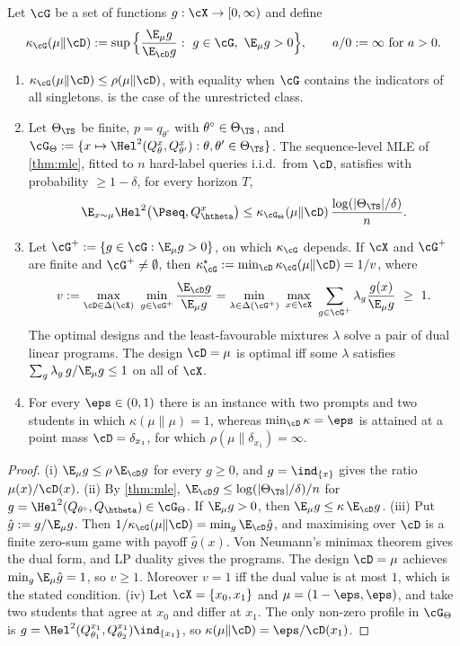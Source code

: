 \begin{proposition}\label{prop:design-game}
\Pv\Ck Let $\cG$ be a set of functions $g:\cX\to[0,\infty)$ and define
\[
\kappa_\cG(\mu\|\cD):=\sup\Big\{\frac{\E_\mu g}{\E_\cD g}:\ g\in\cG,\ \E_\mu g>0\Big\},\qquad a/0:=\infty\text{ for }a>0 .
\]
\begin{enumerate}[label=(\roman*),nosep]
\item $\kappa_\cG(\mu\|\cD)\le\rho(\mu\|\cD)$, with equality when $\cG$ contains the indicators of all
singletons.  is the case of the unrestricted class.
\item Let $\Theta_\TS$ be finite, $p=q_{\theta^\circ}$ with $\theta^\circ\in\Theta_\TS$, and
$\cG_\Theta:=\{x\mapsto\Hel^2(Q^x_\theta,Q^x_{\theta'}):\theta,\theta'\in\Theta_\TS\}$. The sequence-level
MLE of \cref{thm:mle}, fitted to $n$ hard-label queries i.i.d.\ from $\cD$, satisfies with probability
$\ge1-\delta$, for every horizon $T$,
\[
\E_{x\sim\mu}\Hel^2\big(\Pseq,Q^x_{\htheta}\big)\le\kappa_{\cG_\Theta}(\mu\|\cD)\,\frac{\log(|\Theta_\TS|/\delta)}n .
\]
\item Let $\cG^+:=\{g\in\cG:\E_\mu g>0\}$, on which $\kappa_\cG$ depends. If $\cX$ and $\cG^+$ are finite and
$\cG^+\ne\emptyset$, then $\kappa^\star_\cG:=\min_\cD\kappa_\cG(\mu\|\cD)=1/v$, where
\[
v:=\max_{\cD\in\Delta(\cX)}\ \min_{g\in\cG^+}\frac{\E_\cD g}{\E_\mu g}
=\min_{\lambda\in\Delta(\cG^+)}\ \max_{x\in\cX}\ \sum_{g\in\cG^+}\lambda_g\frac{g(x)}{\E_\mu g}\ \ge\ 1 .
\]
The optimal designs and the least-favourable mixtures $\lambda$ solve a pair of dual linear programs.
The design $\cD=\mu$ is optimal iff some $\lambda$ satisfies $\sum_g\lambda_g\,g/\E_\mu g\le1$ on all of $\cX$.
\item For every $\eps\in(0,1)$ there is an instance with two prompts and two students in which
$\kappa(\mu\|\mu)=1$, whereas $\min_\cD\kappa=\eps$ is attained at a point mass $\cD=\delta_{x_1}$, for which
$\rho(\mu\|\delta_{x_1})=\infty$.
\end{enumerate}
\end{proposition}
\begin{proof}
(i) $\E_\mu g\le\rho\,\E_\cD g$ for every $g\ge0$, and $g=\ind_{\{x\}}$ gives the ratio $\mu(x)/\cD(x)$.
(ii) By \cref{thm:mle}, $\E_\cD g\le\log(|\Theta_\TS|/\delta)/n$ for $g=\Hel^2(Q_{\theta^\circ},Q_{\htheta})\in\cG_\Theta$. If
$\E_\mu g>0$, then $\E_\mu g\le\kappa\,\E_\cD g$.
(iii) Put $\hat g:=g/\E_\mu g$. Then $1/\kappa_\cG(\mu\|\cD)=\min_g\E_\cD\hat g$, and maximising over $\cD$ is
a finite zero-sum game with payoff $\hat g(x)$. Von Neumann's minimax theorem gives the dual form, and LP
duality gives the programs. The design $\cD=\mu$ achieves $\min_g\E_\mu\hat g=1$, so $v\ge1$. Moreover $v=1$
iff the dual value is at most $1$, which is the stated condition.
(iv) Let $\cX=\{x_0,x_1\}$ and $\mu=(1-\eps,\eps)$, and take two students that agree at $x_0$ and differ at
$x_1$. The only non-zero profile in $\cG_\Theta$ is $g=\Hel^2(Q^{x_1}_{\theta_1},Q^{x_1}_{\theta_2})\ind_{\{x_1\}}$,
so $\kappa(\mu\|\cD)=\eps/\cD(x_1)$.
\end{proof}

